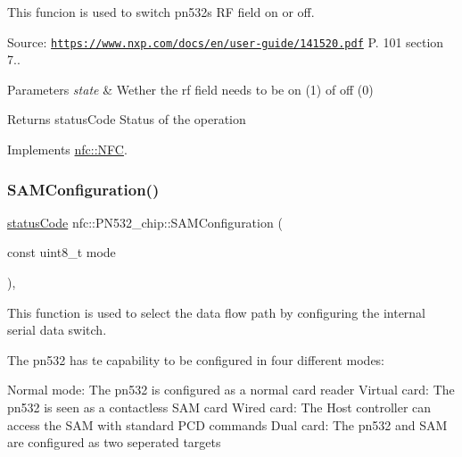 This funcion is used to switch pn532\textquotesingle{}s RF field on or off. 

Source\+: \href{https://www.nxp.com/docs/en/user-guide/141520.pdf}{\tt https\+://www.\+nxp.\+com/docs/en/user-\/guide/141520.\+pdf} P. 101 section 7.. 
\begin{DoxyParams}{Parameters}
{\em state} & Wether the rf field needs to be on (1) of off (0) \\
\hline
\end{DoxyParams}
\begin{DoxyReturn}{Returns}
status\+Code Status of the operation 
\end{DoxyReturn}


Implements \hyperlink{classnfc_1_1NFC_a1179f5330aa9092aff8b1d6f984bc621}{nfc\+::\+N\+FC}.

\mbox{\label{classnfc_1_1PN532__chip_a8c8bdeb6af78024e6fb2ab119575843a}} 
\subsubsection{\texorpdfstring{S\+A\+M\+Configuration()}{SAMConfiguration()}}
{\footnotesize\ttfamily \hyperlink{declarations_8h_ae1d20c5a38cae82ccaa6a77be3fd264b}{status\+Code} nfc\+::\+P\+N532\+\_\+chip\+::\+S\+A\+M\+Configuration (\begin{DoxyParamCaption}\item[{const uint8\+\_\+t}]{mode }\end{DoxyParamCaption})\hspace{0.3cm}{\ttfamily [override]}, {\ttfamily [virtual]}}



This function is used to select the data flow path by configuring the internal serial data switch. 

The pn532 has te capability to be configured in four different modes\+: \begin{DoxyVerb}Normal mode:    The pn532 is configured as a normal card reader
Virtual card:   The pn532 is seen as a contactless SAM card
Wired card:     The Host controller can access the SAM with standard PCD commands
Dual card:      The pn532 and SAM are configured as two seperated targets
\end{DoxyVerb}


